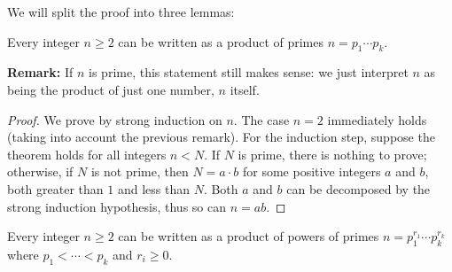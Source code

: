 \documentclass[11pt,dvipsnames]{book}
\numberwithin{equation}{section} %
\numberwithin{figure}{section} %
\numberwithin{table}{section} %
\begin{document}
%
%
%
%
%
%
%



We will split the proof into three lemmas:


\begin{lemma}
Every integer $n\geq 2$ can be written as a product of primes $n=p_{1}\cdots p_{k}$. 
\end{lemma}

{\bf Remark:} If $n$ is prime, this statement still makes sense: we just interpret $n$ as being the product of just one number, $n$ itself. 


\begin{proof}
We prove by strong induction on $n$. The case $n=2$ immediately holds (taking into account the previous remark). For the induction step, suppose the theorem holds for all integers $n<N$.  If $N$ is prime, there is nothing to prove; otherwise, if $N$ is not prime, then $N=a\cdot b$ for some positive integers $a$ and $b$, both greater than $1$ and less than $N$. Both $a$ and $b$ can be  decomposed by the strong induction hypothesis, thus so can $n=ab$.
\end{proof}

\begin{lemma}
Every integer $n\geq 2$ can be written as a product of powers of primes $n=p_{1}^{r_{1}}\cdots p_{k}^{r_{k}}$ where $p_{1}<\cdots < p_{k}$ and $r_{i}\geq 0$. 
\end{lemma}
\end{document}
